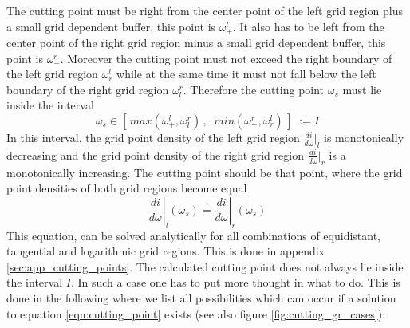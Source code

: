 The cutting point must be right from the center point of the left grid region plus a small grid dependent buffer, this point is $\omega_+^l$. It also has to be left from the center point of the right grid region minus a small grid dependent buffer, this point is $\omega_-^r$. Moreover the cutting point must not exceed the right boundary of the left grid region $\omega_r^l$ while at the same time it must not fall below the left boundary of the right grid region $\omega_l^r$. Therefore the cutting point $\omega_s$ must lie inside the interval
\begin{equation}\label{eqn:cutting_point_boundaries}
	\omega_s \in [\,max(\omega_+^l, \omega_l^r)\,,\;\; min(\omega_-^r, \omega_r^l)\,]\;:=I
\end{equation}
In this interval, the grid point density of the left grid region $\frac{di}{d\omega}|_l$ is monotonically decreasing and the grid point density of the right grid region $\frac{di}{d\omega}|_r$ is a monotonically increasing. The cutting point should be that point, where the grid point densities of both grid regions become equal
\begin{equation}\label{eqn:cutting_point}
	\left. \frac{di}{d\omega}\right|_l(\omega_s) \stackrel{!}{=} \left. \frac{di}{d\omega}\right|_r(\omega_s)
\end{equation}
This equation, can be solved analytically for all combinations of equidistant, tangential and logarithmic grid regions. This is done in appendix \ref{sec:app_cutting_points}. The calculated cutting point does not always lie inside the interval $I$. In such a case one has to put more thought in what to do. This is done in the following where we list all possibilities which can occur if a solution to equation \ref{eqn:cutting_point} exists (see also figure \ref{fig:cutting_gr_cases}):

